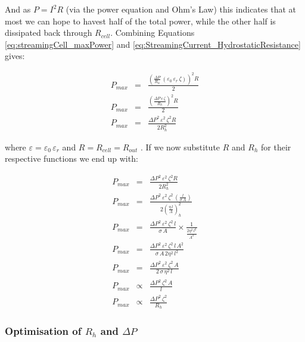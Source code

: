 And as $P=I^{2}R$ (via the power equation and Ohm's Law) this indicates that at
most we can hope to havest half of the total power, while the other half is
dissipated back through $R_{cell}$. Combining Equations
\ref{eq:streamingCell_maxPower} and
\ref{eq:StreamingCurrent_HydrostaticResistance} gives:

\begin{eqnarray*} P_{max} & = & \frac{\left(\frac{\Delta
                P}{R_{h}}\,\left(\varepsilon_{0}\,\varepsilon_{r}\,\zeta\right)\right)^{2}R}{2}\\
    P_{max} & = & \frac{\left(\frac{\Delta
                P\,\varepsilon\,\zeta}{R_{h}}\right)^{2}R}{2}\\ P_{max} & = &
    \frac{\Delta P^{2}\,\varepsilon^{2}\,\zeta^{2}R}{2R_{h}^{2}}
\end{eqnarray*}


where $\varepsilon=\varepsilon_{0}\,\varepsilon_{r}$ and $R=R_{cell}=R_{out}$ .
If we now substitute $R$ and $R_{h}$ for their respective functions we end up
with:

\begin{eqnarray} P_{max} & = & \frac{\Delta
        P^{2}\,\varepsilon^{2}\,\zeta^{2}R}{2R_{h}^{2}}\nonumber \\ P_{max} & =
    & \frac{\Delta P^{2}\,\varepsilon^{2}\,\zeta^{2}\,\left(\frac{l}{\sigma\,
                A}\right)}{2\left(\frac{\eta\, l}{A}\right)_{h}^{2}}\nonumber
    \\ P_{max} & = & \frac{\Delta P^{2}\,\varepsilon^{2}\,\zeta^{2}\,
        l}{\sigma\, A}\times\frac{1}{\frac{2\eta^{2}\, l^{2}}{A^{2}}}\nonumber
    \\ P_{max} & = & \frac{\Delta P^{2}\,\varepsilon^{2}\,\zeta^{2}\, l\,
        A^{2}}{\sigma\, A\,2\eta^{2}\, l^{2}}\nonumber \\ P_{max} & = &
    \frac{\Delta P^{2}\,\varepsilon^{2}\,\zeta^{2}\, A}{2\,\sigma\,\eta^{2}\,
        l}\nonumber \\ P_{max} & \propto & \frac{\Delta P^{2}\,\zeta^{2}\,
        A}{l}\nonumber \\ P_{max} & \propto & \frac{\Delta
        P^{2}\,\zeta^{2}}{R_{h}} \end{eqnarray}



\subsubsection{Optimisation of $R_{h}$ and $\Delta P$}

